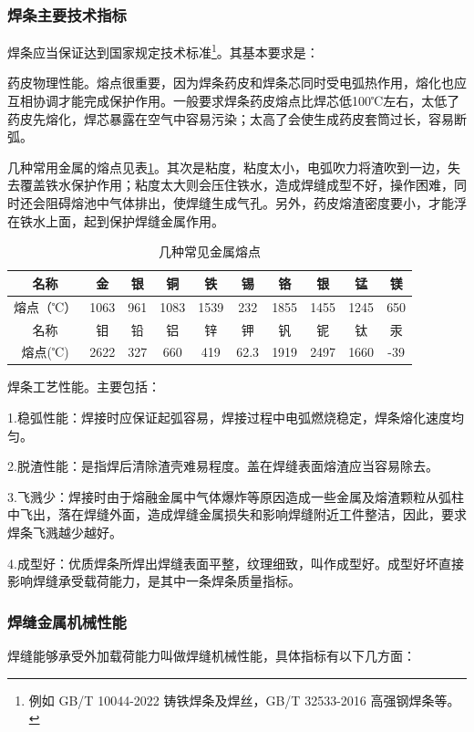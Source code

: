 \documentclass{ctexbook}
\begin{document}
\subsubsection{焊条主要技术指标}
焊条应当保证达到国家规定技术标准\footnote{例如 GB/T 10044-2022  铸铁焊条及焊丝，GB/T 32533-2016  高强钢焊条等。}。其基本要求是：

药皮物理性能。熔点很重要，因为焊条药皮和焊条芯同时受电弧热作用，熔化也应互相协调才能完成保护作用。一般要求焊条药皮熔点比焊芯低100℃左右，太低了药皮先熔化，焊芯暴露在空气中容易污染；太高了会使生成药皮套筒过长，容易断弧。

几种常用金属的熔点见表\ref{tab:jizhongchangjian}。其次是粘度，粘度太小，电弧吹力将渣吹到一边，失去覆盖铁水保护作用；粘度太大则会压住铁水，造成焊缝成型不好，操作困难，同时还会阻碍熔池中气体排出，使焊缝生成气孔。另外，药皮熔渣密度要小，才能浮在铁水上面，起到保护焊缝金属作用。
\begin{table}[htbp]
	\centering
	\caption{几种常见金属熔点}
	\begin{tabular}{c|c|c|c|c|c|c|c|c|c}
		\toprule
		名称    & 金     & 银     & 铜     & 铁     & 锡     & 铬     & 银     & 锰     & 镁 \\
		\midrule
		熔点（℃） & 1063  & 961   & 1083  & 1539  & 232   & 1855  & 1455  & 1245  & 650 \\
		\midrule
		名称    & 钼     & 铅     & 铝     & 锌     & 钾     & 钒     & 铌     & 钛     & 汞 \\
		\midrule
		熔点(℃) & 2622  & 327   & 660   & 419   & 62.3  & 1919  & 2497  & 1660  & -39 \\
		\bottomrule
	\end{tabular}%
	\label{tab:jizhongchangjian}%
\end{table}%

焊条工艺性能。主要包括：

1.稳弧性能：焊接时应保证起弧容易，焊接过程中电弧燃烧稳定，焊条熔化速度均匀。

2.脱渣性能：是指焊后清除渣壳难易程度。盖在焊缝表面熔渣应当容易除去。

3.飞溅少：焊接时由于熔融金属中气体爆炸等原因造成一些金属及熔渣颗粒从弧柱中飞出，落在焊缝外面，造成焊缝金属损失和影响焊缝附近工件整洁，因此，要求焊条飞溅越少越好。

4.成型好：优质焊条所焊出焊缝表面平整，纹理细致，叫作成型好。成型好坏直接影响焊缝承受载荷能力，是其中一条焊条质量指标。
\subsubsection{焊缝金属机械性能}
焊缝能够承受外加载荷能力叫做焊缝机械性能，具体指标有以下几方面：
\end{document}
